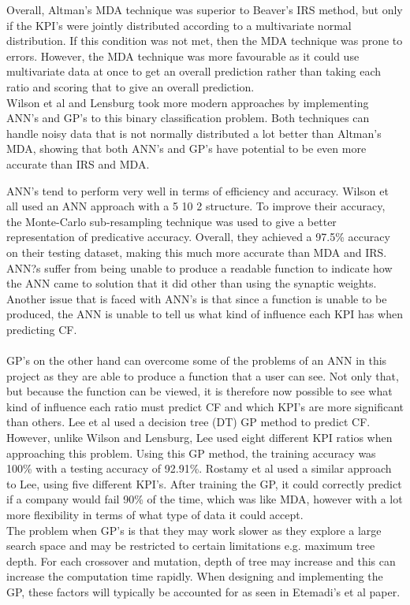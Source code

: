 \documentclass[11pt]{article}
\begin{document}
Overall, Altman's MDA technique was superior to Beaver's IRS method, but only if the KPI's were jointly distributed according to a multivariate normal distribution. If this condition was not met, then the MDA technique was prone to errors. However, the MDA technique was more favourable as it could use multivariate data at once to get an overall prediction rather than taking each ratio and scoring that to give an overall prediction. \\
Wilson et al and Lensburg took more modern approaches by implementing ANN's and GP's to this binary classification problem. Both techniques can handle noisy data that is not normally distributed a lot better than Altman's MDA, showing that both ANN's and GP's have potential to be even more accurate than IRS and MDA. 

ANN's tend to perform very well in terms of efficiency and accuracy. Wilson et all used an ANN approach with a 5 10 2 structure. To improve their accuracy, the Monte-Carlo sub-resampling technique was used to give a better representation of predicative accuracy. Overall, they achieved a 97.5\% accuracy on their testing dataset, making this much more accurate than MDA and IRS. \\
ANN?s suffer from being unable to produce a readable function to indicate how the ANN came to solution that it did other than using the synaptic weights. Another issue that is faced with ANN's is that since a function is unable to be produced, the ANN is unable to tell us what kind of influence each KPI has when predicting CF.\\
\\
GP's on the other hand can overcome some of the problems of an ANN in this project as they are able to produce a function that a user can see. Not only that, but because the function can be viewed, it is therefore now possible to see what kind of influence each ratio must predict CF and which KPI's are more significant than others. 
Lee et al used a decision tree (DT) GP method to predict CF. However, unlike Wilson and Lensburg, Lee used eight different KPI ratios when approaching this problem. Using this GP method, the training accuracy was 100\% with a testing accuracy of 92.91\%. Rostamy et al used a similar approach to Lee, using five different KPI's. After training the GP, it could correctly predict if a company would fail 90\% of the time, which was like MDA, however with a lot more flexibility in terms of what type of data it could accept. \\
The problem when GP's is that they may work slower as they explore a large search space and may be restricted to certain limitations e.g. maximum tree depth. For each crossover and mutation, depth of tree may increase and this can increase the computation time rapidly. When designing and implementing the GP, these factors will typically be accounted for as seen in Etemadi's et al paper. \\
\end{document}
